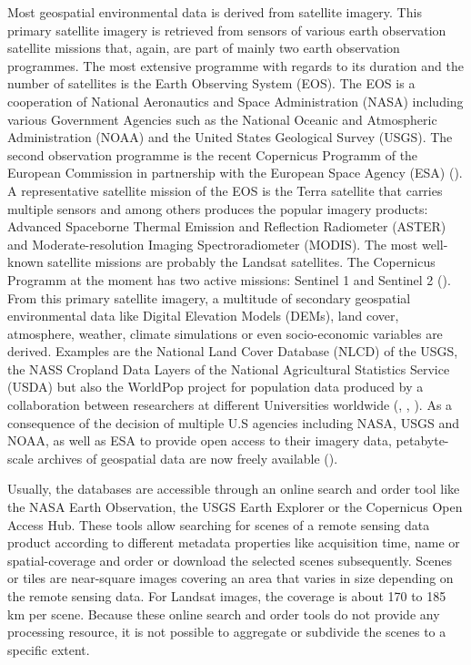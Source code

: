 Most geospatial environmental data is derived from satellite imagery. This primary satellite imagery is retrieved from sensors of various earth observation satellite missions that, again, are part of mainly two earth observation programmes. The most extensive programme with regards to its duration and the number of satellites is the Earth Observing System (EOS). The EOS is a cooperation of National Aeronautics and Space Administration (NASA) including various Government Agencies such as the National Oceanic and Atmospheric Administration (NOAA) and the United States Geological Survey (USGS). The second observation programme is the recent Copernicus Programm of the European Commission in partnership with the European Space Agency (ESA) (\cite{salomonson2002overview}). A representative satellite mission of the EOS is the Terra satellite that carries multiple sensors and among others produces the popular imagery products: Advanced Spaceborne Thermal Emission and Reflection Radiometer (ASTER) and Moderate-resolution Imaging Spectroradiometer (MODIS). The most well-known satellite missions are probably the Landsat satellites. The Copernicus Programm at the moment has two active missions: Sentinel 1 and Sentinel 2 (\cite{butler2014earth}).
From this primary satellite imagery, a multitude of secondary geospatial environmental data like Digital Elevation Models (DEMs), land cover, atmosphere, weather, climate simulations or even socio-economic variables are derived. Examples are the National Land Cover Database (NLCD) of the USGS, the NASS Cropland Data Layers of the National Agricultural Statistics Service (USDA) but also the WorldPop project for population data produced by a collaboration between researchers at different Universities worldwide (\cite{homer2007completion}, \cite{johnson20102009}, \cite{tatem2017worldpop}). 
As a consequence of the decision of multiple U.S agencies including NASA, USGS and NOAA, as well as ESA to provide open access to their imagery data, petabyte-scale archives of geospatial data are now freely available (\cite{gorelick2017google}).

Usually, the databases are accessible through an online search and order tool like the NASA Earth Observation, the USGS Earth Explorer or the Copernicus Open Access Hub. These tools allow searching for scenes of a remote sensing data product according to different metadata properties like acquisition time, name or spatial-coverage and order or download the selected scenes subsequently. 
Scenes or tiles are near-square images covering an area that varies in size depending on the remote sensing data. For Landsat images, the coverage is about 170 to 185 km per scene. Because these online search and order tools do not provide any processing resource, it is not possible to aggregate or subdivide the scenes to a specific extent.

